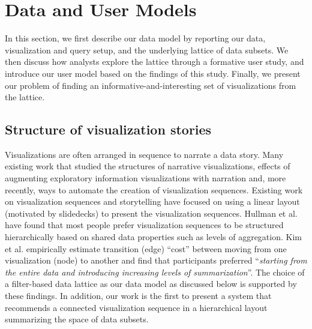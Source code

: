 \section{Data and User Models} 

In this section, we first describe our data model by reporting our data, visualization and query setup, and the underlying lattice of data subsets. We then discuss how analysts explore the lattice through a formative user study, and introduce our user model based on the findings of this study. Finally, we present our problem of finding an informative-and-interesting set of visualizations from the lattice.

\subsection{Structure of visualization stories}
\npar {} 
Visualizations are often arranged in sequence to narrate a data story. Many existing work that studied the structures of narrative visualizations\cite{Segel2010,Hullman2017}, effects of augmenting exploratory information visualizations with narration\cite{Boy2015} and, more recently, ways to automate the creation of visualization sequences\cite{Hullman2013,Kim2017}. Existing work on visualization sequences and storytelling have focused on using a linear layout (motivated by slidedecks) to present the visualization sequences. Hullman et al. \cite{Hullman2017} have found that most people prefer visualization sequences to be structured hierarchically based on shared data properties such as levels of aggregation. %
Kim et al. \cite{Kim2017} empirically estimate transition (edge) ``cost'' between moving from one visualization (node) to another and find that participants preferred ``\textit{starting from the entire data and introducing increasing levels of summarization}''. The choice of a filter-based data lattice as our data model as discussed below is supported by these findings. In addition, our work is the first to present a system that recommends a connected visualization sequence in a hierarchical layout summarizing the space of data subsets.


